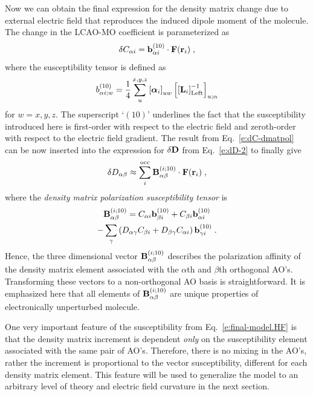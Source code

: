 \documentclass[aip,amsmath,amssymb,reprint,floatfix]{revtex4-1}
\newcommand{\BM}[1]{\bm{#1}}
\begin{document}
Now we can obtain the final expression for the density matrix change 
due to external electric field that reproduces the 
induced dipole moment of the molecule.
The change in the LCAO\hyp{}MO coefficient is parameterized as
%
\begin{equation} \label{e:dC-dmatpol}
 \delta C_{\alpha i} = {\bf b}_{\alpha i}^{(10)} \cdot {\bf F}({\bf r}_i)  \;,
\end{equation}
%
where the susceptibility tensor is defined as
%
\begin{equation} \label{e:susceptibility-b}
  b_{\alpha i;w}^{(10)}= \frac{1}{4} \sum_u^{x, y, z} \left[ {\BM{\alpha}}_i \right]_{uw}
   \left[ \left[ {\bf L}_i  \right]^{-1}_{\rm Left} \right]_{u;\alpha}  
\end{equation}
%
for $w=x,y,z$. 
The superscript `$(10)$' underlines the fact that the susceptibility introduced here
is first\hyp{}order with respect to the electric field and zeroth\hyp{}order with respect to
the electric field gradient.
The result from Eq.~\eqref{e:dC-dmatpol} can be now inserted into 
the expression for $\delta {\bf D}$ from Eq.~\eqref{e:dD-2} to finally give
%
\begin{equation}\label{e:final-model.HF}
 \delta D_{\alpha\beta} \approx \sum_i^{\rm occ} {\bf B}^{(i;10)}_{\alpha\beta} \cdot {\bf F}({\bf r}_i)  \;,
\end{equation}
%
where the \emph{density matrix polarization susceptibility tensor} is
%
\begin{multline}  \label{e:susceptibility-B}
 {\bf B}^{(i;10)}_{\alpha\beta} = %
                               C_{\alpha i} {\bf b}_{\beta i}^{(10)} + C_{\beta i} {\bf b}_{\alpha i}^{(10)} \\
                                - \sum_\gamma 
                                 \left( 
               D_{\alpha\gamma} C_{\beta i} + D_{\beta\gamma} C_{\alpha i}
                                 \right)
                                           {\bf b}_{\gamma i}^{(10)}
%
 \;.
\end{multline}
%
Hence, the three dimensional vector ${\bf B}^{(i;10)}_{\alpha\beta}$ describes the polarization affinity
of the density matrix element associated with the $\alpha$th and $\beta$th orthogonal AO's.
Transforming these vectors to a non\hyp{}orthogonal AO basis is straightforward.
It is emphasized here that all elements of ${\bf B}_{\alpha\beta}^{(i;10)}$
are unique properties of electronically unperturbed molecule. 

One very important feature of the susceptibility from Eq.~\eqref{e:final-model.HF} is that
the density matrix increment is dependent \emph{only} on the susceptibility element associated with the same
pair of AO's. Therefore, there is no mixing in the AO's, rather the increment is proportional to the 
vector susceptibility, different for each density matrix element. This feature will be used to
generalize the model to an arbitrary level of theory and electric field curvature in the next section.
\end{document}
